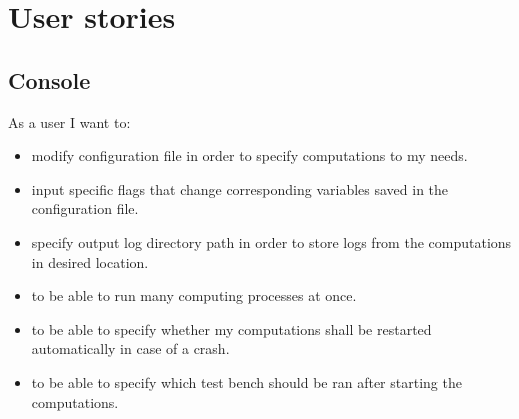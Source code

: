 \documentclass{article}
\begin{document}
\newpage
\section{User stories}


%
%
\subsection{Console}
As a user I want to:
\begin{itemize}
	\item 
		modify configuration file in order to specify computations to my needs.

	\item 
		input specific flags that change corresponding variables saved in the configuration file.
		
	\item 
		specify output log directory path in order to store logs from the computations in desired location.
		
	\item 
		to be able to run many computing processes at once.
	
	\item
		to be able to specify whether my computations shall be restarted automatically in case of a crash.

	\item
		to be able to specify which test bench should be ran after starting the computations.
				

		
\end{itemize}


%
%
\end{document}
